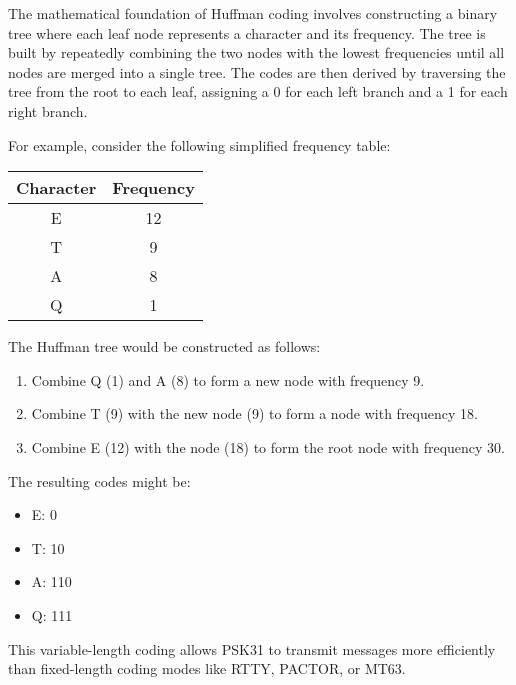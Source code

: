 The mathematical foundation of Huffman coding involves constructing a binary tree where each leaf node represents a character and its frequency. The tree is built by repeatedly combining the two nodes with the lowest frequencies until all nodes are merged into a single tree. The codes are then derived by traversing the tree from the root to each leaf, assigning a 0 for each left branch and a 1 for each right branch.

For example, consider the following simplified frequency table:

\begin{center}
\begin{tabular}{|c|c|}
\hline
Character & Frequency \\
\hline
E & 12 \\
T & 9 \\
A & 8 \\
Q & 1 \\
\hline
\end{tabular}
\end{center}

The Huffman tree would be constructed as follows:
\begin{enumerate}
    \item Combine Q (1) and A (8) to form a new node with frequency 9.
    \item Combine T (9) with the new node (9) to form a node with frequency 18.
    \item Combine E (12) with the node (18) to form the root node with frequency 30.
\end{enumerate}

The resulting codes might be:
\begin{itemize}
    \item E: 0
    \item T: 10
    \item A: 110
    \item Q: 111
\end{itemize}

This variable-length coding allows PSK31 to transmit messages more efficiently than fixed-length coding modes like RTTY, PACTOR, or MT63.

